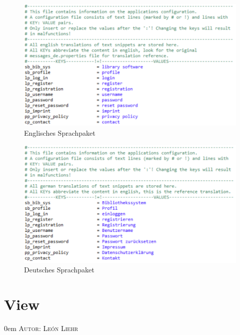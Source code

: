 \documentclass{article}
\makeatletter
\newcommand{\sectionauthor}[1]{
	{\parindent 0em \large \scshape Autor: #1 \par \nobreak \vspace*{1em}}
	\@afterheading
}
\makeatother
\begin{document}
\begin{figure}[H]
\hypertarget{messagesen}{}
\centering
\includegraphics[width=50em]{messagesen}
\caption{Englisches Sprachpaket}
\end{figure}

\begin{figure}[H]
\hypertarget{messagesde}{}
\centering
\includegraphics[width=50em]{messagesde}
\caption{Deutsches Sprachpaket}
\end{figure}
\restoregeometry


\section{View}
\sectionauthor{León Liehr}

\newcommand{\M}[1]{\texttt{#1}} %
\newcommand{\tag}[2]{\M{#1:#2}} %
\newcommand{\B}[1]{\M{\RB{#1}}} %
\newcommand{\RB}[1]{\#\{#1\}} %
\newcommand{\2}[1]{\multirow{2}{*}{#1}}
\newcommand{\3}[1]{\multirow{3}{*}{#1}}
\newcommand{\4}[1]{\multirow{4}{*}{#1}}
\newcommand{\disambiguationrule}{\arrayrulecolor{lightgray}\cmidrule(r){3-4}\arrayrulecolor{black}}
\newcommand{\INDENT}{\hspace{0.3cm}}
\end{document}
